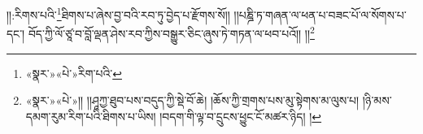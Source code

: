 །།:རིགས་པའི་\footnote{«སྣར་»«པེ་»རིག་པའི་}ཐིགས་པ་ཞེས་བྱ་བའི་རབ་ཏུ་བྱེད་པ་རྫོགས་སོ།། །།པཎྜི་ཏ་གཞན་ལ་ཕན་པ་བཟང་པོ་ལ་སོགས་པ་དང་། བོད་ཀྱི་ལོ་ཙཱ་བ་བློ་ལྡན་ཤེས་རབ་ཀྱིས་བསྒྱུར་ཅིང་ཞུས་ཏེ་གཏན་ལ་ཕབ་པའོ།། །།\footnote{«སྣར་»«པེ་»།། །།ཤཱཀྱ་ཐུབ་པས་བདུད་ཀྱི་སྡེ་བོ་ཆེ། །ཆོས་ཀྱི་གྲགས་པས་མུ་སྟེགས་མ་ལུས་པ། །ཉི་མས་དམག་རུམ་རིག་པའི་ཐིགས་པ་ཡིས། །བདག་གི་ལྟ་བ་དྲུངས་ཕྱུང་ངོ་མཚར་ཉིད། །}